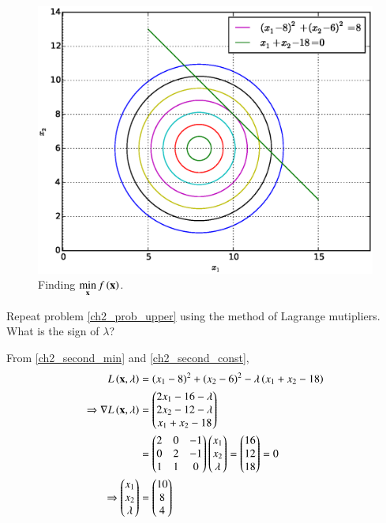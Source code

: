 \documentclass[journal,12pt,twocolumn]{IEEEtran}
\begin{document}
%
\begin{figure}[!ht]
\centering
\includegraphics[width=\columnwidth]{./figs/2.8.eps}
\caption{ Finding $ \displaystyle \min_{\mathbf{x}}f\left(\mathbf{x}\right)$.}
\label{fig.2.8}	
\end{figure}
%
\begin{problem}
Repeat problem \ref{ch2_prob_upper} using the method of Lagrange mutipliers.  What is the sign of $\lambda$?
\end{problem}
%
\solution
From \eqref{ch2_second_min} and \eqref{ch2_second_const}, 
%
\begin{align}
L\left(\mathbf{x},\lambda\right) &= (x_1-8)^2 + (x_2-6)^2 - \lambda \left(x_1 + x_2 - 18\right) \\
\Rightarrow \nabla L\left(\mathbf{x},\lambda\right)  & = 
\begin{pmatrix}
2x_1  - 16 - \lambda \\
2x_2 - 12 - \lambda \\
x_1 + x_2 -18
\end{pmatrix}
\\
&=
\begin{pmatrix}
2 &0 & - 1 \\
0 &2 & - 1 \\
1 & 1 & 0 
\end{pmatrix}
\begin{pmatrix}
x_1 \\
x_2 \\
\lambda
\end{pmatrix}
= 
\begin{pmatrix}
16 \\
 12 \\
18
\end{pmatrix}
=
0 
\\
\Rightarrow 
\begin{pmatrix}
x_1 \\
x_2 \\
\lambda
\end{pmatrix}
&= 
\begin{pmatrix}
10 \\
 8 \\
4
\end{pmatrix}
\end{align}
\end{document}
